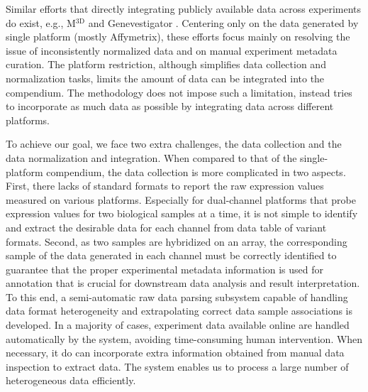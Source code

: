 Similar efforts that directly integrating publicly available data across experiments do exist, e.g., M$^{\textrm{3D}}$ \cite{Faith2008} and Genevestigator \cite{Hruz2008}. Centering only on the data generated by single platform (mostly Affymetrix), these efforts focus mainly on resolving the issue of inconsistently normalized data and on manual experiment metadata curation. The platform restriction, although simplifies data collection and normalization tasks, limits the amount of data can be integrated into the compendium. The methodology does not impose such a limitation, instead tries to incorporate as much data as possible by integrating data across different platforms.

To achieve our goal, we face two extra challenges, the data collection and the data normalization and integration. When compared to that of the single-platform compendium, the data collection is more complicated in two aspects. First, there lacks of standard formats to report the raw expression values measured on various platforms.  Especially for dual-channel platforms that probe expression values for two biological samples at a time, it is not simple to identify and extract the desirable data for each channel from data table of variant formats. Second, as two samples are hybridized on an array, the corresponding sample of the data generated in each channel must be correctly identified to guarantee that the proper experimental metadata information is used for annotation that is crucial for downstream data analysis and result interpretation. To this end, a semi-automatic raw data parsing subsystem capable of handling data format heterogeneity and extrapolating correct data sample associations is developed. In a majority of cases, experiment data available online are handled automatically by the system, avoiding time-consuming human intervention. When necessary, it do can incorporate extra information obtained from manual data inspection to extract data. The system enables us to process a large number of heterogeneous data efficiently. 

